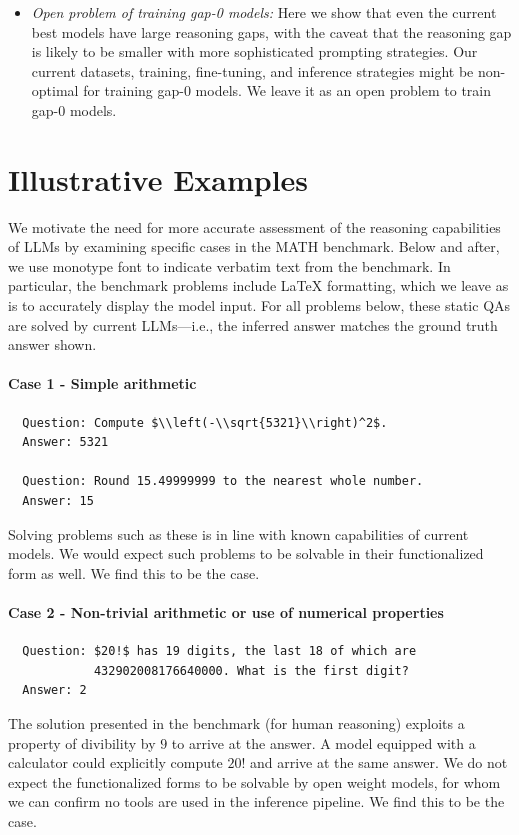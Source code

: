 \documentclass[11pt,a4paper]{article}
\begin{document}
\begin{itemize}
  \item {\em Open problem of training gap-0 models:}
    Here we show that even the current best models have large reasoning gaps,
    with the caveat that the reasoning gap is likely to be smaller with more
    sophisticated prompting strategies. Our current datasets, training,
    fine-tuning, and inference strategies might be non-optimal for training
    gap-0 models. We leave it as an open problem to train gap-0 models.

\end{itemize}


\section{Illustrative Examples}
We motivate the need for more accurate assessment of the reasoning capabilities
of LLMs by examining specific cases in the MATH benchmark.
Below and after, we use monotype font to indicate verbatim text from the
benchmark. In particular, the benchmark problems include LaTeX formatting, which
we leave as is to accurately display the model input.
For all problems below, these static QAs are solved by current LLMs---i.e.,
the inferred answer matches the ground truth answer shown.

\paragraph{Case 1 - Simple arithmetic}
\begin{verbatim}
  Question: Compute $\\left(-\\sqrt{5321}\\right)^2$.
  Answer: 5321

  Question: Round 15.49999999 to the nearest whole number.
  Answer: 15
\end{verbatim}
Solving problems such as these is in line with known capabilities of current models.
We would expect such problems to be solvable in their
functionalized form as well. We find this to be the case.

\paragraph{Case 2 - Non-trivial arithmetic or use of numerical properties}
\begin{verbatim}
  Question: $20!$ has 19 digits, the last 18 of which are
            432902008176640000. What is the first digit?
  Answer: 2
\end{verbatim}
The solution presented in the benchmark (for human reasoning) exploits a
property of divibility by $9$ to arrive at the answer. A model equipped with a
calculator could explicitly compute $20!$ and arrive at the same answer.
We do not expect the functionalized forms to be solvable by open weight models,
for whom we can confirm no tools are used in the inference pipeline. We find
this to be the case.
\end{document}
